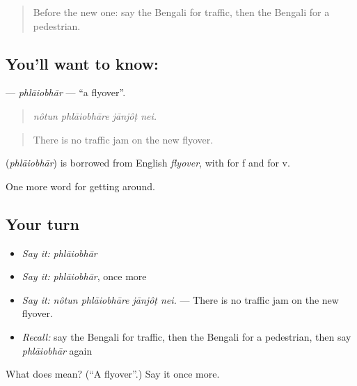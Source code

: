 \label{lesson:BN-C392-phlaiobhar}



\begin{quote}
Before the new one: say the Bengali for traffic, then the Bengali for a pedestrian.
\end{quote}

\subsection*{You'll want to know: }
\textbf{} — \emph{phlāiobhār} — \textquotedblleft{}a flyover\textquotedblright{}.

\begin{quote}
   
\end{quote}

\begin{quote}
\emph{nôtun phlāiobhāre jānjôṭ nei.}
\end{quote}

\begin{quote}
There is no traffic jam on the new flyover.
\end{quote}

\begin{cousinweb}
\textbf{} (\emph{phlāiobhār}) is borrowed from English \emph{flyover}, with  for f and  for v.
\end{cousinweb}

\begin{grammarlens}[title={What you've built}]
One more word for getting around.
\end{grammarlens}

\subsection*{Your turn}
\begin{itemize}
\raggedright
  \item \emph{Say it:} \emph{phlāiobhār}
  \item \emph{Say it:} \emph{phlāiobhār}, once more
  \item \emph{Say it:} \emph{nôtun phlāiobhāre jānjôṭ nei.} — There is no traffic jam on the new flyover.
  \item \emph{Recall:} say the Bengali for traffic, then the Bengali for a pedestrian, then say \emph{phlāiobhār} again
\end{itemize}

\begin{tcolorbox}[breakable,colback=teal!4,colframe=teal!35!black,title={Before you move on}]
What does  mean? (\textquotedblleft{}A flyover\textquotedblright{}.) Say it once more.
\end{tcolorbox}
